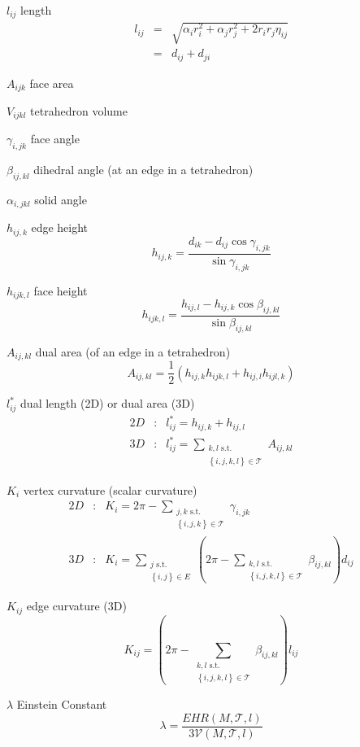 \documentclass{article}
\begin{document}
$l_{ij}$ length%
\begin{eqnarray*}
l_{ij} &=&\sqrt{\alpha _{i}r_{i}^{2}+\alpha _{j}r_{j}^{2}+2r_{i}r_{j}\eta
_{ij}} \\
&=&d_{ij}+d_{ji}
\end{eqnarray*}

$A_{ijk}$ face area

$V_{ijkl}$ tetrahedron volume

$\gamma _{i,jk}$ face angle

$\beta _{ij,kl}$ dihedral angle (at an edge in a tetrahedron)

$\alpha _{i,jkl}$ solid angle

$h_{ij,k}$ edge height%
\[
h_{ij,k}=\frac{d_{ik}-d_{ij}\cos \gamma _{i,jk}}{\sin \gamma _{i,jk}}
\]

$h_{ijk,l}$ face height%
\[
h_{ijk,l}=\frac{h_{ij,l}-h_{ij,k}\cos \beta _{ij,kl}}{\sin \beta _{ij,kl}}
\]

$A_{ij,kl}$ dual area (of an edge in a tetrahedron)%
\[
A_{ij,kl}=\frac{1}{2}\left( h_{ij,k}h_{ijk,l}+h_{ij,l}h_{ijl,k}\right) 
\]

$l_{ij}^{\ast }$ dual length (2D) or dual area (3D) 
\begin{eqnarray*}
2D &:&l_{ij}^{\ast }=h_{ij,k}+h_{ij,l} \\
3D &:&l_{ij}^{\ast }=\sum_{\substack{ k,l\text{ s.t.} \\ \left\{
i,j,k,l\right\} \in \mathcal{T}}}A_{ij,kl}
\end{eqnarray*}

$K_{i}$ vertex curvature (scalar curvature)%
\begin{eqnarray*}
2D &:&K_{i}=2\pi -\sum_{\substack{ j,k\text{ s.t.} \\ \left\{ i,j,k\right\}
\in \mathcal{T}}}\gamma _{i,jk} \\
3D &:&K_{i}=\sum_{\substack{ j\text{ s.t.} \\ \left\{ i,j\right\} \in E}}%
\left( 2\pi -\sum_{\substack{ k,l\text{ s.t.} \\ \left\{ i,j,k,l\right\} \in 
\mathcal{T}}}\beta _{ij,kl}\right) d_{ij}
\end{eqnarray*}

$K_{ij}$ edge curvature (3D)%
\[
K_{ij}=\left( 2\pi -\sum_{\substack{ k,l\text{ s.t.} \\ \left\{
i,j,k,l\right\} \in \mathcal{T}}}\beta _{ij,kl}\right) l_{ij}
\]

$\lambda $ Einstein Constant%
\[
\lambda =\frac{EHR\left( M,\mathcal{T},l\right) }{3\mathcal{V}\left( M,%
\mathcal{T},l\right) }
\]
\end{document}
